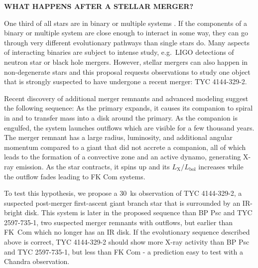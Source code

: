 \documentclass[letterpaper,11pt]{article}
\begin{document}
\pagestyle{plain}


 

\begin{center} 
\bfseries\uppercase{%
What happens after a stellar merger?
}
\end{center}

One third of all stars are in binary or multiple systems \cite{Raghavan+2010}. If the components of a binary or multiple system are close enough to interact in some way, they can go through very different evolutionary pathways than single stars do. 
Many aspects of interacting binaries are subject to intense study, e.g.\ LIGO detections of neutron star or black hole mergers. However, stellar mergers can also happen in non-degenerate stars and this proposal requests observations to study one object that is strongly suspected to have undergone a recent merger: TYC 4144-329-2. 

Recent discovery of additional merger remnants and advanced modeling suggest the following sequence: As the primary expands, it causes its companion to spiral in and to transfer mass into a disk around the primary. As the companion is engulfed, the system launches outflows which are visible for a few thousand years. The merger remnant has a large radius, luminosity, and additional angular momentum compared to a giant that did not accrete a companion, all of which leads to the formation of a convective zone and an active dynamo, generating X-ray emission. As the star contracts, it spins up and its $L_\mathrm{X}/L_\mathrm{bol}$ increases while the outflow fades leading to FK Com systems. 

To test this hypothesis, we propose a 30~ks observation of TYC 4144-329-2, a suspected post-merger first-ascent giant branch star that is surrounded by an IR-bright disk. This system is later in the proposed sequence than BP Psc and  TYC 2597-735-1, two suspected merger remnants with outflows, but earlier than FK~Com which no longer has an IR disk. If the evolutionary sequence described above is correct, TYC 4144-329-2 should show more X-ray activity than BP Psc and  TYC 2597-735-1, but less than FK Com - a prediction easy to test with a Chandra observation.
\end{document}
